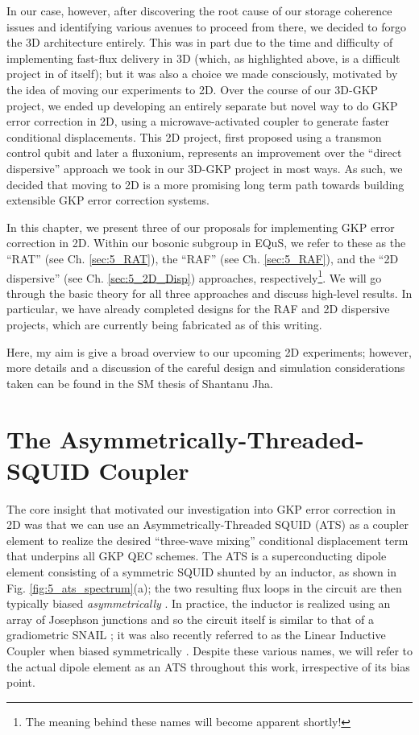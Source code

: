 In our case, however, after discovering the root cause of our storage coherence issues and identifying various avenues to proceed from there, we decided to forgo the 3D architecture entirely. This was in part due to the time and difficulty of implementing fast-flux delivery in 3D (which, as highlighted above, is a difficult project in of itself); but it was also a choice we made consciously, motivated by the idea of moving our experiments to 2D. Over the course of our 3D-GKP project, we ended up developing an entirely separate but novel way to do GKP error correction in 2D, using a microwave-activated coupler to generate faster conditional displacements. This 2D project, first proposed using a transmon control qubit and later a fluxonium, represents an improvement over the ``direct dispersive'' approach we took in our 3D-GKP project in most ways. As such, we decided that moving to 2D is a more promising long term path towards building extensible GKP error correction systems. 

In this chapter, we present three of our proposals for implementing GKP error correction in 2D. Within our bosonic subgroup in EQuS, we refer to these as the ``RAT'' (see Ch. \ref{sec:5_RAT}), the ``RAF'' (see Ch. \ref{sec:5_RAF}), and the ``2D dispersive'' (see Ch. \ref{sec:5_2D_Disp}) approaches, respectively\footnote{The meaning behind these names will become apparent shortly!}. We will go through the basic theory for all three approaches and discuss high-level results. In particular, we have already completed designs for the RAF and 2D dispersive projects, which are currently being fabricated as of this writing. 

Here, my aim is give a broad overview to our upcoming 2D experiments; however, more details and a discussion of the careful design and simulation considerations taken can be found in the SM thesis of Shantanu Jha. 
\clearpage


\section{The Asymmetrically-Threaded-SQUID Coupler \label{sec:5_RAT}}

The core insight that motivated our investigation into GKP error correction in 2D was that we can use an Asymmetrically-Threaded SQUID (ATS) as a coupler element to realize the desired ``three-wave mixing'' conditional displacement term that underpins all GKP QEC schemes. The ATS is a superconducting dipole element consisting of a symmetric SQUID shunted by an inductor, as shown in Fig. \ref{fig:5_ats_spectrum}(a); the two resulting flux loops in the circuit are then typically biased \textit{asymmetrically} \cite{lescanne2020exponential, berdou2023one}. In practice, the inductor is realized using an array of Josephson junctions and so the circuit itself is similar to that of a gradiometric SNAIL \cite{miano2022frequency}; it was also recently referred to as the Linear Inductive Coupler when biased symmetrically \cite{maiti2024ancilla}. Despite these various names, we will refer to the actual dipole element as an ATS throughout this work, irrespective of its bias point. 

